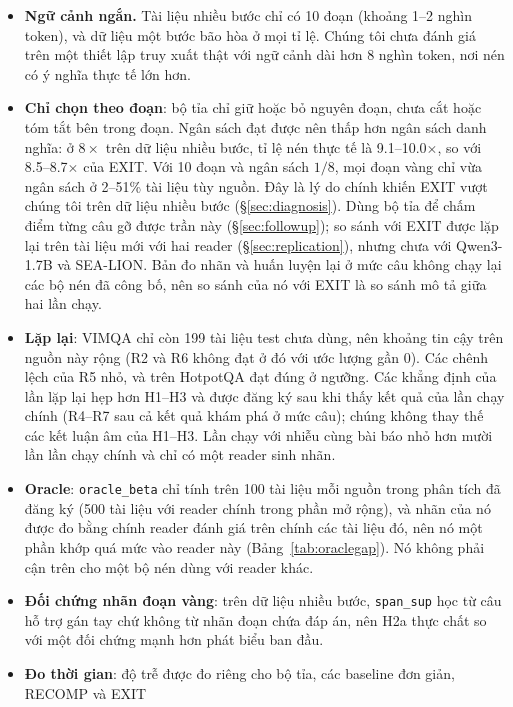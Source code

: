 \documentclass[11pt]{article}
\newcommand{\arm}[1]{\texttt{#1}}
\begin{document}
\begin{itemize}
  của chúng vì vậy không phải bằng chứng cho điều ngược lại.
  \item \textbf{Ngữ cảnh ngắn.} Tài liệu nhiều bước chỉ có 10 đoạn (khoảng 1--2 nghìn token), và dữ liệu một bước bão hòa
  ở mọi tỉ lệ. Chúng tôi chưa đánh giá trên một thiết lập truy xuất thật với ngữ cảnh dài hơn 8 nghìn token, nơi nén có ý
  nghĩa thực tế lớn hơn.
  \item \textbf{Chỉ chọn theo đoạn}: bộ tỉa chỉ giữ hoặc bỏ nguyên đoạn, chưa cắt hoặc
  tóm tắt bên trong đoạn. Ngân sách đạt được nên thấp hơn ngân sách danh nghĩa: ở $8\times$ trên dữ liệu nhiều
  bước, tỉ lệ nén thực tế là 9.1--10.0$\times$, so với 8.5--8.7$\times$ của EXIT. Với 10 đoạn và ngân sách $1/8$,
  mọi đoạn vàng chỉ vừa ngân sách ở 2--51\% tài liệu tùy nguồn. Đây là lý do chính khiến EXIT vượt chúng tôi trên
  dữ liệu nhiều bước (\S\ref{sec:diagnosis}). Dùng bộ tỉa để chấm điểm từng câu gỡ được trần này
  (\S\ref{sec:followup}); so sánh với EXIT được lặp lại trên tài liệu mới với hai reader (\S\ref{sec:replication}),
  nhưng chưa với Qwen3-1.7B và SEA-LION. Bản đo nhãn và huấn luyện lại ở mức câu không chạy lại các bộ nén đã công
  bố, nên so sánh của nó với EXIT là so sánh mô tả giữa hai lần chạy.
  \item \textbf{Lặp lại}: VIMQA chỉ còn 199 tài liệu test chưa dùng, nên khoảng tin cậy trên nguồn này rộng (R2 và R6
  không đạt ở đó với ước lượng gần 0). Các chênh lệch của R5 nhỏ, và trên HotpotQA đạt đúng ở ngưỡng. Các khẳng định
  của lần lặp lại hẹp hơn H1--H3 và được đăng ký sau khi thấy kết quả của lần chạy chính (R4--R7 sau cả kết quả khám
  phá ở mức câu); chúng không thay thế các kết luận âm của H1--H3. Lần chạy với nhiễu cùng bài báo nhỏ hơn mười lần lần chạy chính và chỉ có một reader sinh nhãn.
  \item \textbf{Oracle}: \arm{oracle\_beta} chỉ tính trên 100 tài liệu mỗi nguồn trong phân tích đã đăng ký (500 tài
  liệu với reader chính trong phần mở rộng), và nhãn của nó được đo bằng chính
  reader đánh giá trên chính các tài liệu đó, nên nó một phần khớp quá mức vào reader này
  (Bảng~\ref{tab:oraclegap}). Nó không phải cận trên cho một bộ nén dùng với reader khác.
  \item \textbf{Đối chứng nhãn đoạn vàng}: trên dữ liệu nhiều bước, \arm{span\_sup} học từ câu hỗ trợ gán
  tay chứ không từ nhãn đoạn chứa đáp án, nên H2a thực chất so với một đối chứng mạnh hơn phát biểu ban đầu.
  \item \textbf{Đo thời gian}: độ trễ được đo riêng cho bộ tỉa, các baseline đơn giản, RECOMP và EXIT

\end{itemize}
\end{document}
